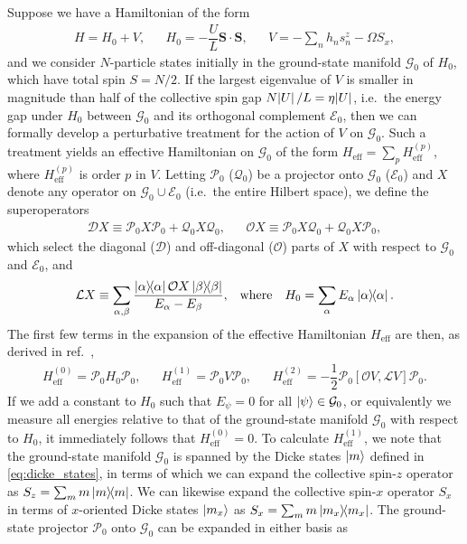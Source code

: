 \documentclass[aps,notitlepage,nofootinbib,11pt]{revtex4-1}
\renewcommand{\t}{\text} %
\newcommand{\f}[2]{\dfrac{#1}{#2}} %
\renewcommand{\sp}[1]{\left[#1\right]} %
\renewcommand{\v}{\bm} %
\renewcommand{\c}{\cdot} %
\newcommand{\D}{\mathcal{D}}
\newcommand{\E}{\mathcal{E}}
\newcommand{\G}{\mathcal{G}}
\renewcommand{\L}{\mathcal{L}}
\renewcommand{\O}{\mathcal{O}}
\renewcommand{\P}{\mathcal{P}}
\newcommand{\Q}{\mathcal{Q}}
\newcommand{\1}{\mathds{1}}
\begin{document}
Suppose we have a Hamiltonian of the form
\begin{align}
  H = H_0 + V,
  &&
  H_0 = - \f{U}{L} \v S\c\v S,
  &&
  V = - \sum_n h_n s_n^z - \Omega S_x,
\end{align}
and we consider $N$-particle states initially in the ground-state
manifold $\G_0$ of $H_0$, which have total spin $S=N/2$.  If the
largest eigenvalue of $V$ is smaller in magnitude than half of the
collective spin gap $N\abs{U}/L=\eta\abs{U}$, i.e.~the energy gap
under $H_0$ between $\G_0$ and its orthogonal complement $\E_0$, then
we can formally develop a perturbative treatment for the action of $V$
on $\G_0$.  Such a treatment yields an effective Hamiltonian on $\G_0$
of the form $H_{\t{eff}}=\sum_pH_{\t{eff}}^{(p)}$, where
$H_{\t{eff}}^{(p)}$ is order $p$ in $V$.  Letting $\P_0$ ($\Q_0$) be a
projector onto $\G_0$ ($\E_0$) and $X$ denote any operator on
$\G_0\cup\E_0$ (i.e.~the entire Hilbert space), we define the
superoperators
\begin{align}
  \D X \equiv \P_0 X \P_0 + \Q_0 X \Q_0,
  &&
  \O X \equiv \P_0 X \Q_0 + \Q_0 X \P_0,
\end{align}
which select the diagonal ($\D$) and off-diagonal ($\O$) parts of $X$
with respect to $\G_0$ and $\E_0$, and
\begin{align}
  \L X \equiv \sum_{\alpha,\beta}
  \f{\op{\alpha}\O X\op{\beta}}{E_\alpha-E_\beta},
  &&
  \t{where}
  &&
  H_0 = \sum_\alpha E_\alpha \op\alpha.
\end{align}
The first few terms in the expansion of the effective Hamiltonian
$H_{\t{eff}}$ are then, as derived in
ref.~\cite{bravyi2011schrieffer},
\begin{align}
  H_{\t{eff}}^{(0)} = \P_0 H_0 \P_0,
  &&
  H_{\t{eff}}^{(1)} = \P_0 V \P_0,
  &&
  H_{\t{eff}}^{(2)} = -\f12 \P_0 \sp{\O V,\L V} \P_0.
  \label{eq:H_eff_012}
\end{align}
If we add a constant to $H_0$ such that $E_\psi=0$ for all
$\ket\psi\in\G_0$, or equivalently we measure all energies relative to
that of the ground-state manifold $\G_0$ with respect to $H_0$, it
immediately follows that $H_{\t{eff}}^{(0)}=0$.  To calculate
$H_{\t{eff}}^{(1)}$, we note that the ground-state manifold $\G_0$ is
spanned by the Dicke states $\ket{m}$ defined in
\eqref{eq:dicke_states}, in terms of which we can expand the
collective spin-$z$ operator as $S_z=\sum_mm\op{m}$.  We can likewise
expand the collective spin-$x$ operator $S_x$ in terms of $x$-oriented
Dicke states $\ket{m_x}$ as $S_x=\sum_mm\op{m_x}$.  The ground-state
projector $\P_0$ onto $\G_0$ can be expanded in either basis as
\end{document}
